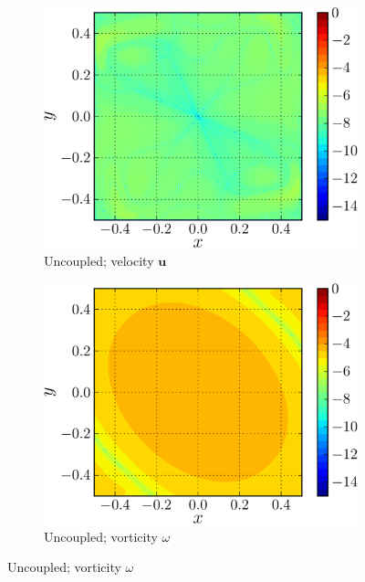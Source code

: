 	\begin{figure}[!b]
     \centering
     \begin{subfigure}[t]{0.45\textwidth}
             \includegraphics[width=\linewidth]{./figures/validation/lambOseent2/lambOseen_uncoupled_vErrorFinal_compressed-crop.png}
             \caption{Uncoupled; velocity $\mathbf{u}$}
             \label{fig:lambOseen_uncoupled_vErrorFinal}
     \end{subfigure}%
     \qquad %
     \begin{subfigure}[t]{0.45\textwidth}
             \includegraphics[width=\linewidth]{./figures/validation/lambOseent2/lambOseen_uncoupled_wErrorFinal_compressed-crop.png}
             \caption{Uncoupled; vorticity $\omega$}
             \label{fig:lambOseen_uncoupled_wErrorFinal}
     \end{subfigure}%
       

\end{figure}
